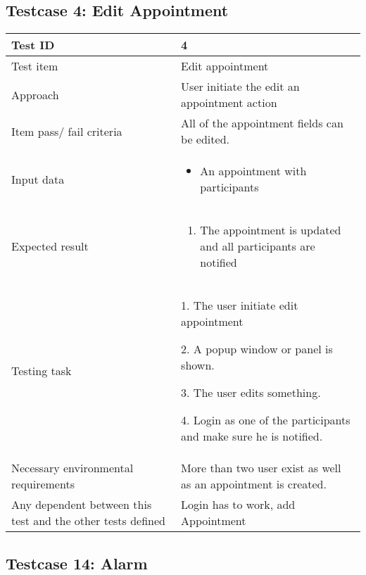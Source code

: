 \documentclass[a4paper, english, 12pt]{article}
\begin{document}
\subsection{Testcase 4: Edit Appointment}

\begin{tabularx}{\textwidth}{ |X|X| }
\hline
\rowcolor{Gray}
Test ID & 4 \\ \hline
Test item & Edit appointment \\ \hline
Approach & User initiate the edit an appointment action \\ \hline
Item pass/ fail criteria & All of the appointment fields can be edited.\\ \hline
Input data & 
\begin{itemize}
	\item An appointment with participants
\end{itemize}\\ \hline
Expected result & 
\begin{enumerate}
	\item The appointment is updated and all participants are notified
\end{enumerate} \\ \hline
Testing task &
\begin{task steps}
	\item 1. The user initiate edit appointment
	\item 2. A popup window or panel is shown. 
	\item 3. The user edits something.
	\item 4. Login as one of the participants and make sure he is notified. 
\end{task steps}	\\ \hline
Necessary environmental requirements & More than two user exist as well as an appointment is created.   \\ \hline
Any dependent between this test and the other tests defined & Login has to work, add Appointment  \\ \hline

\end{tabularx}

\subsection{Testcase 14: Alarm}
\end{document}
